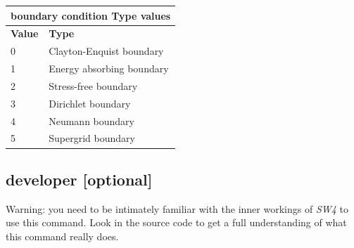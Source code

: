 \documentclass[11pt]{report}
\begin{document}
\begin{center}
\begin{tabular}{|l|p{10cm}|} \hline
\multicolumn{2}{|c|}{\bf boundary condition Type values }\\ \hline
\bf{Value} & \bf{Type} \\ \hline \hline
0 & Clayton-Enquist boundary   \\ \hline
1 & Energy absorbing boundary  \\ \hline
2 & Stress-free boundary       \\ \hline
3 & Dirichlet boundary         \\ \hline
4 & Neumann boundary           \\ \hline
5 & Supergrid boundary         \\ \hline
\end{tabular}
\end{center}

\subsection{developer [optional]}
\label{keyword:developer}
Warning: you need to be intimately familiar with the inner workings of \emph{SW4} to use this
command. Look in the source code to get a full understanding of what this command really does.
\end{document}

